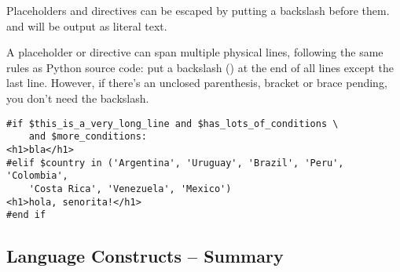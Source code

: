 Placeholders and directives can be escaped by putting a backslash before them.
 and  will be output as literal text.

A placeholder or directive can span multiple physical lines, following the same
rules as Python source code: put a backslash (\code{\\}) at the end of all
lines except the last line.  However, if there's an unclosed parenthesis,
bracket or brace pending, you don't need the backslash.


\begin{verbatim}
#if $this_is_a_very_long_line and $has_lots_of_conditions \
    and $more_conditions:
<h1>bla</h1>
#elif $country in ('Argentina', 'Uruguay', 'Brazil', 'Peru', 'Colombia',
    'Costa Rica', 'Venezuela', 'Mexico')
<h1>hola, senorita!</h1>
#end if
\end{verbatim}

\subsection{Language Constructs -- Summary}
\label{language.constructs}

